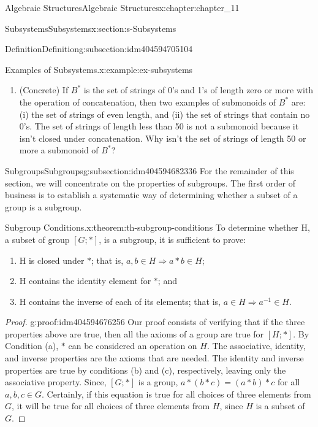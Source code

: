 \documentclass[twoside,10pt,]{book}
\numberwithin{equation}{section}
\begin{document}
\begin{chapterptx}{Algebraic Structures}{}{Algebraic Structures}{}{}{x:chapter:chapter_11}
\begin{sectionptx}{Subsystems}{}{Subsystems}{}{}{x:section:s-Subsystems}
\begin{subsectionptx}{Definition}{}{Definition}{}{}{g:subsection:idm404594705104}
\begin{example}{Examples of Subsystems.}{x:example:ex-subsystems}
\begin{enumerate}[label=(\alph*)]
\item{}(Concrete) If \(B^*\) is the set of strings of 0's and 1's of length zero or more with the operation of concatenation, then two examples of submonoids of \(B^*\) are: (i) the set of strings of even length, and (ii) the set of strings that contain no 0's. The set of strings of length less than 50 is not a submonoid because it isn't closed under concatenation. Why isn't the set of strings of length 50 or more a submonoid of \(B^*\)?%
\end{enumerate}
%
\end{example}
\end{subsectionptx}
%
%
\typeout{************************************************}
\typeout{************************************************}
%
\begin{subsectionptx}{Subgroups}{}{Subgroups}{}{}{g:subsection:idm404594682336}
For the remainder of this section, we will concentrate on the properties of subgroups. The first order of business is to establish a systematic way of determining whether a subset of a group is a subgroup.%
\begin{theorem}{Subgroup Conditions.}{}{x:theorem:th-subgroup-conditions}%
To determine whether H, a subset of group \([G;*]\), is a subgroup, it is sufficient to prove:%
\begin{enumerate}[label=(\alph*)]
\item{}H is closed under \(*\); that is, \(a, b \in  H \Rightarrow a * b \in  H\);%
\item{}H contains the identity element for \(*\); and%
\item{}H contains the inverse of each of its elements; that is,  \(a\in  H \Rightarrow a^{-1}\in  H\).%
\end{enumerate}
%
\end{theorem}
\begin{proof}{}{g:proof:idm404594676256}
Our proof consists of verifying that if the three properties above are true, then all the axioms of a group are true for \([H ; *]\). By Condition (a), \(*\) can be considered an operation on \(H\). The associative, identity, and inverse properties are the axioms that are needed. The identity and inverse properties are true by conditions (b) and (c), respectively, leaving only the associative property. Since, \([G; *]\) is a group, \(a * (b * c) = (a * b) * c\) for all \(a, b, c \in  G\). Certainly, if this equation is true for all choices of three elements from \(G\), it will be true for all choices of three elements from \(H\), since \(H\) is a subset of \(G\).%

\end{proof}
\end{subsectionptx}
\end{sectionptx}
\end{chapterptx}
\end{document}
